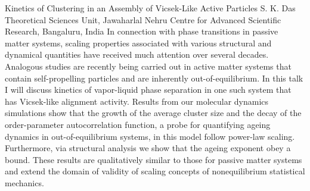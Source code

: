 
    \begin{abstract_online}{Kinetics of Clustering in an Assembly of Vicsek-Like Active Particles}{%
        S. K. Das}{%
        \IStag}{%
        Theoretical Sciences Unit, Jawaharlal Nehru Centre for Advanced Scientific Research, Bangaluru, India}
    In connection with phase transitions in passive matter systems, scaling properties associated with various structural and dynamical quantities have received much attention over several decades. Analogous studies are recently being carried out in active matter systems that contain self-propelling particles and are inherently out-of-equilibrium. In this talk I will discuss kinetics of vapor-liquid phase separation in one such system that has Vicsek-like alignment activity. Results from our molecular dynamics simulations show that the growth of the average cluster size and the decay of the order-parameter autocorrelation function, a probe for quantifying ageing dynamics in out-of-equilibrium systems, in this model follow power-law scaling. Furthermore, via structural analysis we show that the ageing exponent obey a bound. These results are qualitatively similar to those for passive matter systems and extend the domain of validity of scaling concepts of nonequilibrium statistical mechanics.  
    
    \end{abstract_online}
    
